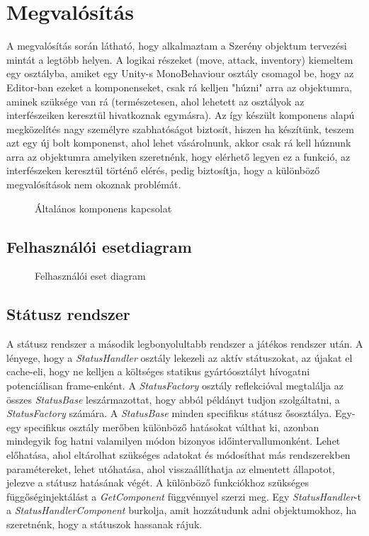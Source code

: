 \cleardoublepage
\section{Megvalósítás}
A megvalósítás során látható, hogy alkalmaztam a Szerény objektum tervezési mintát a legtöbb helyen. A logikai részeket (move, attack, inventory) kiemeltem egy osztályba, amiket egy Unity-s MonoBehaviour osztály csomagol be, hogy az Editor-ban ezeket a komponenseket, csak rá kelljen "húzni" arra az objektumra, aminek szüksége van rá (természetesen, ahol lehetett az osztályok az interfészeiken keresztül hivatkoznak egymásra). Az így készült komponens alapú megközelítés nagy személyre szabhatóságot biztosít, hiszen ha készítünk, teszem azt egy új bolt komponenst, ahol lehet vásárolnunk, akkor csak rá kell húznunk arra az objektumra amelyiken szeretnénk, hogy elérhető legyen ez a funkció, az interfészeken keresztül történő elérés, pedig biztosítja, hogy a különböző megvalósítások nem okoznak problémát.

\begin{figure}[H]
	\noindent{}
	\caption{Általános komponens kapcsolat}
	\label{GeneralComponentSystem}
\end{figure}

\subsection{Felhasználói esetdiagram} 
\begin{figure}[H]
	\noindent{}
	\caption{Felhasználói eset diagram}
	\label{useCase}
\end{figure}

\subsection{Státusz rendszer}
A státusz rendszer a második legbonyolultabb rendszer a játékos rendszer után. A lényege, hogy a \textit{StatusHandler} osztály lekezeli az aktív státuszokat, az újakat el cache-eli, hogy ne kelljen a költséges statikus gyártóosztályt hívogatni potenciálisan frame-enként. A \textit{StatusFactory} osztály reflekcióval megtalálja az összes \textit{StatusBase} leszármazottat, hogy abból példányt tudjon szolgáltatni, a \textit{StatusFactory} számára. A \textit{StatusBase} minden specifikus státusz ősosztálya. Egy-egy specifikus osztály merőben különböző hatásokat válthat ki, azonban  mindegyik fog hatni valamilyen módon bizonyos időintervallumonként. Lehet előhatása, ahol eltárolhat szükséges adatokat és módosíthat más rendszerekben paramétereket, lehet utóhatása, ahol visszaállíthatja az elmentett állapotot, jelezve a státusz hatásának végét. A különböző funkciókhoz szükséges függőséginjektálást a \textit{GetComponent} függvénnyel szerzi meg. Egy \textit{StatusHandler}-t a \textit{StatusHandlerComponent} burkolja, amit hozzátudunk adni objektumokhoz, ha szeretnénk, hogy a státuszok hassanak rájuk.

